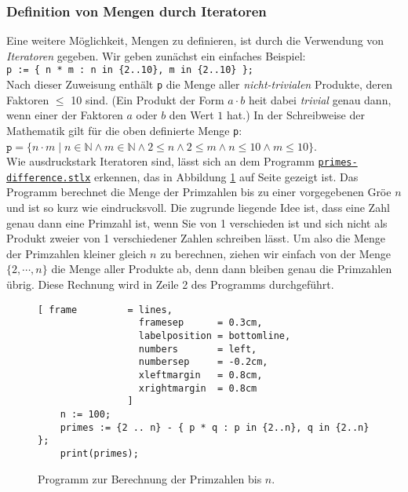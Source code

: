 \subsubsection{Definition von Mengen durch Iteratoren}
Eine weitere M\"{o}glichkeit, Mengen zu definieren, ist durch die Verwendung von
\emph{Iteratoren} gegeben.  Wir geben zun\"{a}chst ein einfaches Beispiel: 
\\[0.2cm]
\hspace*{1.3cm} 
\texttt{p := \{ n * m : n in \{2..10\}, m in \{2..10\} \};} 
\\[0.2cm]
Nach dieser Zuweisung enth\"{a}lt \texttt{p} die Menge aller \emph{nicht-trivialen} Produkte, deren
Faktoren $\leq$ 10 sind.  (Ein Produkt der Form $a \cdot b$ hei\3t dabei \emph{trivial} genau
dann, wenn einer der Faktoren $a$ oder $b$ den Wert $1$ hat.)
In der Schreibweise der Mathematik  gilt f\"{u}r die oben definierte Menge \texttt{p}: 
\\[0.2cm]
\hspace*{1.3cm} 
$\mathtt{p} = \bigl\{ n \cdot m \mid n \in \mathbb{N} \wedge m \in \mathbb{N} \wedge 
                                 2 \leq n \wedge 2 \leq m \wedge n \leq 10 \wedge m \leq 10 
              \bigl\}
$. 
\\[0.2cm]
Wie ausdruckstark Iteratoren sind, l\"{a}sst sich an dem Programm 
\href{https://github.com/karlstroetmann/Logik/blob/master/SetlX/primes-difference.stlx}{\texttt{primes-difference.stlx}}
erkennen, das in Abbildung \ref{fig:primes-sieve.stlx} auf Seite \pageref{fig:primes-sieve.stlx}
gezeigt ist.  Das Programm berechnet die Menge der Primzahlen bis zu einer
vorgegebenen Gr\"{o}\3e $n$ und ist so kurz wie eindrucksvoll.  Die zugrunde liegende
Idee ist, dass eine Zahl genau dann eine Primzahl ist, wenn Sie von 1
verschieden ist und sich nicht als Produkt zweier von 1 verschiedener Zahlen
schreiben l\"{a}sst.  Um also die Menge der Primzahlen kleiner gleich $n$ zu
berechnen, ziehen wir einfach von der Menge  $\{ 2, \cdots, n \}$ die Menge aller Produkte
ab, denn dann bleiben genau die Primzahlen \"{u}brig.   Diese Rechnung wird in Zeile 2 des Programms
durchgef\"{u}hrt.  


\begin{figure}[!ht]
  \centering
\begin{Verbatim}[ frame         = lines, 
                  framesep      = 0.3cm, 
                  labelposition = bottomline,
                  numbers       = left,
                  numbersep     = -0.2cm,
                  xleftmargin   = 0.8cm,
                  xrightmargin  = 0.8cm
                ]
    n := 100;
    primes := {2 .. n} - { p * q : p in {2..n}, q in {2..n} };
    print(primes);
\end{Verbatim} 
\vspace*{-0.3cm}
\caption{Programm zur Berechnung der Primzahlen bis $n$.}
  \label{fig:primes-sieve.stlx}
\end{figure} %

